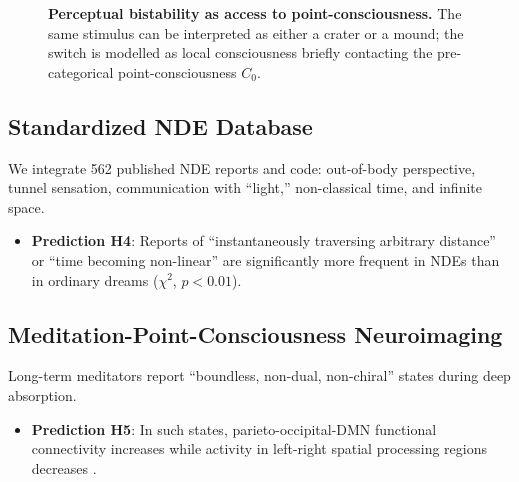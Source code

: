 \documentclass[11pt,a4paper]{article}
\begin{document}
\begin{figure}[htbp]
\centering
{}
\caption{\textbf{Perceptual bistability as access to point-consciousness.} The same stimulus can be interpreted as either a crater or a mound; the switch is modelled as local consciousness briefly contacting the pre-categorical point-consciousness $C_0$.}
\label{fig:bistability}
\end{figure}

\subsection{Standardized NDE Database}

We integrate 562 published NDE reports \cite{vanlommel2001,greyson1983} and code: out-of-body perspective, tunnel sensation, communication with ``light,'' non-classical time, and infinite space.
\begin{itemize}
\item \textbf{Prediction H4}: Reports of ``instantaneously traversing arbitrary distance'' or ``time becoming non-linear'' are significantly more frequent in NDEs than in ordinary dreams ($\chi^2$, $p < 0.01$).
\end{itemize}

\subsection{Meditation-Point-Consciousness Neuroimaging}

Long-term meditators report ``boundless, non-dual, non-chiral'' states during deep absorption.
\begin{itemize}
\item \textbf{Prediction H5}: In such states, parieto-occipital-DMN functional connectivity increases while activity in left-right spatial processing regions decreases \cite{lutz2008}.
\end{itemize}
\end{document}
